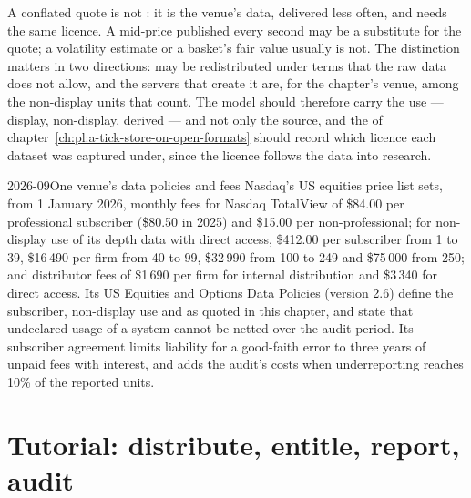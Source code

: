 A conflated quote is not : it is the venue's data, delivered less often, and needs the same licence. A mid-price published every
second may be a substitute for the quote; a volatility estimate or a basket's fair value usually is not. The distinction matters in two
directions:  may be redistributed under terms that the raw data does not allow, and the servers that create it are, for the
chapter's venue, among the non-display units that count. The  model should therefore carry the use --- display, non-display,
derived --- and not only the source, and the  of chapter~\ref{ch:pl:a-tick-store-on-open-formats} should record which licence
each dataset was captured under, since the licence follows the data into research.

\begin{dated}{2026-09}{One venue's data policies and fees}\label{dat:pl:market-data-distribution-and-entitlements:nasdaq}
Nasdaq's US equities price list sets, from 1 January 2026, monthly fees for Nasdaq TotalView of \$84.00 per professional subscriber (\$80.50
in 2025) and \$15.00 per non-professional; for non-display use of its depth data with direct access, \$412.00 per subscriber from 1 to 39,
\$16\,490 per firm from 40 to 99, \$32\,990 from 100 to 249 and \$75\,000 from 250; and distributor fees of \$1\,690 per firm for internal
distribution and \$3\,340 for direct access. Its US Equities and Options Data Policies (version 2.6) define the subscriber, non-display use and
 as quoted in this chapter, and state that undeclared usage of a system cannot be netted over the audit period. Its subscriber
agreement limits liability for a good-faith error to three years of unpaid fees with interest, and adds the audit's costs when underreporting
reaches 10\% of the reported units.
\end{dated}

\section{Tutorial: distribute, entitle, report, audit}\label{tut:pl:market-data-distribution-and-entitlements:tut}

